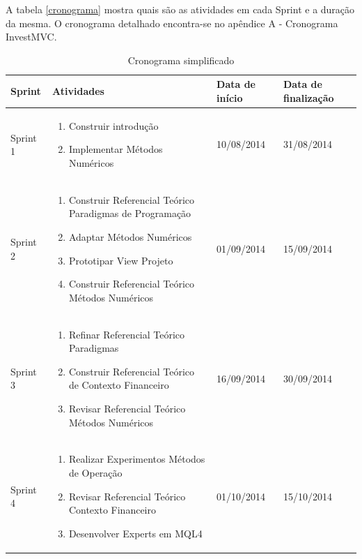 A tabela \ref{cronograma} mostra quais são as atividades em cada Sprint e a duração da mesma. O cronograma detalhado encontra-se no apêndice A - Cronograma InvestMVC.

\begin{table}
\caption{Cronograma simplificado}
\begin{center}
    \begin{tabular}{  | p{2cm} | p{8cm} | p{2cm}| p{2cm} |}
    \hline
    \textbf{Sprint} & \textbf{Atividades} & \textbf{Data de início} & \textbf{Data de finalização}\\ \hline
    Sprint 1 & \begin{enumerate}
    \item Construir introdução
    \item Implementar Métodos Numéricos
    \end{enumerate} & 10/08/2014 & 31/08/2014\\ \hline
    
    Sprint 2 & \begin{enumerate}
    \item Construir Referencial Teórico Paradigmas de Programação
    \item Adaptar Métodos Numéricos
    \item Prototipar View Projeto
    \item Construir Referencial Teórico Métodos Numéricos
    \end{enumerate} & 01/09/2014 & 15/09/2014\\ \hline
    
    Sprint 3 & \begin{enumerate}
    \item Refinar Referencial Teórico Paradigmas
    \item Construir Referencial Teórico de Contexto Financeiro
    \item Revisar Referencial Teórico Métodos Numéricos
    \end{enumerate} & 16/09/2014 & 30/09/2014\\ \hline
    
    Sprint 4 & \begin{enumerate}
    \item Realizar Experimentos Métodos de Operação
    \item Revisar Referencial Teórico Contexto Financeiro
    \item Desenvolver Experts em MQL4
    \end{enumerate} & 01/10/2014 & 15/10/2014\\ \hline
    

\end{tabular}
\end{center}
\end{table}
